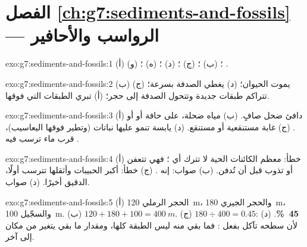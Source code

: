 \section*{الفصل \ref{ch:g7:sediments-and-fossils} --- الرواسب والأحافير}

\begin{solution}{exo:g7:sediments-and-fossils:1}
(أ) ؛ (ب) ؛ (ج) ؛ (د) ؛ (ه) ؛ (و) .
\end{solution}

\begin{solution}{exo:g7:sediments-and-fossils:2}
(ب) يموت الحيوان؛ (د) يغطي  الصدفة بسرعة؛ (ج) تتراكم طبقات جديدة
وتتحول الصدفة إلى حجر؛ (أ) تبري  الطبقات التي فوقها.
\end{solution}

\begin{solution}{exo:g7:sediments-and-fossils:3}
(أ)  دافئ ضحل صافٍ. (ب) مياه ضحلة، على حافة  أو  أو . (ج)
غابة مستنقعية أو مستنقع. (د) يابسة تنمو عليها نباتات (وتطير فوقها
اليعاسيب)، قرب ماء ترسب فيه .
\end{solution}

\begin{solution}{exo:g7:sediments-and-fossils:4}
(أ) خطأ: معظم الكائنات الحية لا تترك أي ؛ فهي تتعفن أو تذوب قبل أن
تُدفن. (ب) صواب: إنه . (ج) خطأ: أكبر الحبيبات وأثقلها تترسب
أولًا،  الدقيق أخيرًا. (د) صواب.
\end{solution}

\begin{solution}{exo:g7:sediments-and-fossils:5}
(أ) الحجر الرملي \qty{120}{m}، والحجر الجيري \qty{180}{m}، والسجّيل
\qty{100}{m}. (ب) $120 + 180 + 100 = \qty{400}{m}$. (ج) $180 \div 400 = 0.45$:
\textbf{45~\%}. (د) لأن سطحه تآكل بفعل : فما بقي منه ليس الطبقة
كلها، ومقدار ما بقي يتغير من مكان إلى آخر.
\end{solution}

